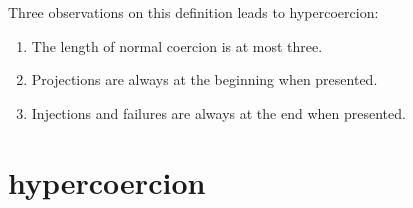 \documentclass[acmsmall,review,anonymous]{acmart}\settopmatter{printfolios=true,printccs=false,printacmref=false}
\begin{document}
Three observations on this definition leads to hypercoercion: 
\begin{enumerate}
	\item The length of normal coercion is at most three.
	\item Projections are always at the beginning when presented.
	\item Injections and failures are always at the end when presented.
\end{enumerate}


\section{hypercoercion} \label{sec:hypercoercion}
\end{document}
